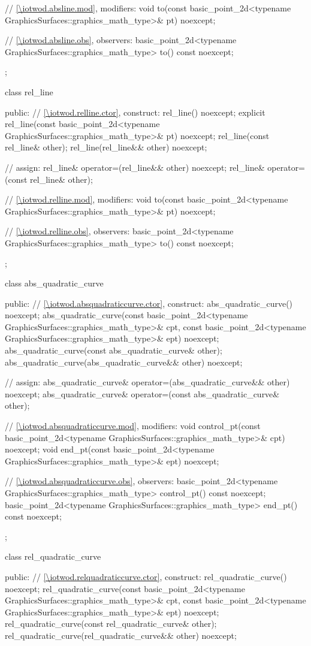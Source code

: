 \begin{codeblock}
{{{      // \ref{\iotwod.absline.mod}, modifiers:
      void to(const basic_point_2d<typename GraphicsSurfaces::graphics_math_type>& pt) noexcept;

      // \ref{\iotwod.absline.obs}, observers:
      basic_point_2d<typename GraphicsSurfaces::graphics_math_type> to() const noexcept;
    };

    class rel_line {
    public:
      // \ref{\iotwod.relline.ctor}, construct:
      rel_line() noexcept;
      explicit rel_line(const basic_point_2d<typename
        GraphicsSurfaces::graphics_math_type>& pt) noexcept;
      rel_line(const rel_line& other);
      rel_line(rel_line&& other) noexcept;

      // assign:
      rel_line& operator=(rel_line&& other) noexcept;
      rel_line& operator=(const rel_line& other);

      // \ref{\iotwod.relline.mod}, modifiers:
      void to(const basic_point_2d<typename GraphicsSurfaces::graphics_math_type>& pt) noexcept;

      // \ref{\iotwod.relline.obs}, observers:
      basic_point_2d<typename GraphicsSurfaces::graphics_math_type> to() const noexcept;
    };

    class abs_quadratic_curve {
    public:
      // \ref{\iotwod.absquadraticcurve.ctor}, construct:
      abs_quadratic_curve() noexcept;
      abs_quadratic_curve(const basic_point_2d<typename
        GraphicsSurfaces::graphics_math_type>& cpt, const basic_point_2d<typename
        GraphicsSurfaces::graphics_math_type>& ept) noexcept;
      abs_quadratic_curve(const abs_quadratic_curve& other);
      abs_quadratic_curve(abs_quadratic_curve&& other) noexcept;

      // assign:
      abs_quadratic_curve& operator=(abs_quadratic_curve&& other) noexcept;
      abs_quadratic_curve& operator=(const abs_quadratic_curve& other);

      // \ref{\iotwod.absquadraticcurve.mod}, modifiers:
      void control_pt(const basic_point_2d<typename
        GraphicsSurfaces::graphics_math_type>& cpt) noexcept;
      void end_pt(const basic_point_2d<typename
        GraphicsSurfaces::graphics_math_type>& ept) noexcept;

      // \ref{\iotwod.absquadraticcurve.obs}, observers:
      basic_point_2d<typename GraphicsSurfaces::graphics_math_type> control_pt() const noexcept;
      basic_point_2d<typename GraphicsSurfaces::graphics_math_type> end_pt() const noexcept;
    };

    class rel_quadratic_curve {
    public:
      // \ref{\iotwod.relquadraticcurve.ctor}, construct:
      rel_quadratic_curve() noexcept;
      rel_quadratic_curve(const basic_point_2d<typename
        GraphicsSurfaces::graphics_math_type>& cpt, const basic_point_2d<typename
        GraphicsSurfaces::graphics_math_type>& ept) noexcept;
      rel_quadratic_curve(const rel_quadratic_curve& other);
      rel_quadratic_curve(rel_quadratic_curve&& other) noexcept;

}}}
\end{codeblock}
